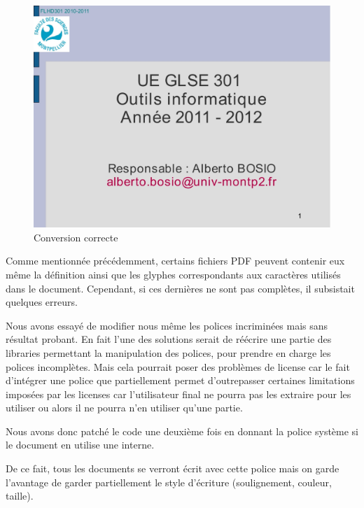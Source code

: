  \begin{figure}[h]
        \begin{center}
            \includegraphics[scale=0.2]{images/GLSE301_2011-2012_seance_11_goodConv.jpg} 
        \end{center}

        \caption{Conversion correcte}
        \label{Conversion correcte}
    \end{figure}
Comme mentionnée précédemment, certains fichiers PDF peuvent contenir eux 
même la définition ainsi que les glyphes correspondants aux caractères utilisés dans 
le document. Cependant, si ces dernières ne sont pas complètes, il subsistait
quelques erreurs.

Nous avons essayé de modifier nous même les polices incriminées mais 
sans résultat probant. En fait l'une des solutions serait de réécrire une partie des
libraries permettant la manipulation des polices, pour prendre en charge les polices 
incomplètes. Mais cela pourrait poser des problèmes de license car le fait d'intégrer une
police que partiellement permet d'outrepasser certaines limitations imposées par les licenses car 
l'utilisateur final ne pourra pas les extraire pour les utiliser ou alors il ne pourra n'en utiliser qu'une
partie.

 Nous avons donc patché le code une deuxième fois 
en donnant la police système si le document en utilise une interne.

De ce fait, tous les documents se verront écrit avec cette police mais 
on garde l'avantage de garder partiellement le style d'écriture 
(soulignement, couleur, taille).

